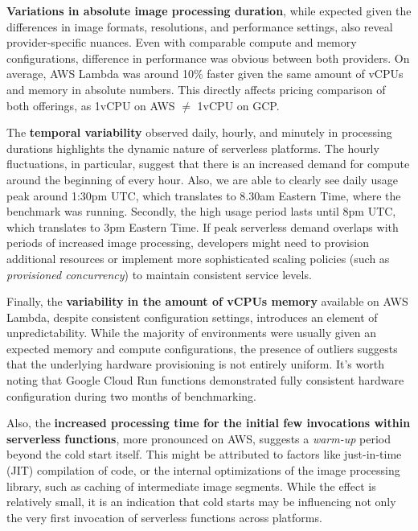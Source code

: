 \textbf{Variations in absolute image processing duration}, while expected given the differences in image formats, resolutions, and performance settings, also reveal provider-specific nuances. Even with comparable compute and memory configurations, difference in performance was obvious between both providers. On average, AWS Lambda was around 10\% faster given the same amount of vCPUs and memory in absolute numbers. This directly affects pricing comparison of both offerings, as 1vCPU on AWS $\neq$ 1vCPU on GCP.

The \textbf{temporal variability} observed daily, hourly, and minutely in processing durations highlights the dynamic nature of serverless platforms. The hourly fluctuations, in particular, suggest that there is an increased demand for compute around the beginning of every hour. Also, we are able to clearly see daily usage peak around 1:30pm UTC, which translates to 8.30am Eastern Time, where the benchmark was running. Secondly, the high usage period lasts until 8pm UTC, which translates to 3pm Eastern Time. If peak serverless demand overlaps with periods of increased image processing, developers might need to provision additional resources or implement more sophisticated scaling policies (such as \emph{provisioned concurrency}) to maintain consistent service levels.

Finally, the \textbf{variability in the amount of vCPUs memory} available on AWS Lambda, despite consistent configuration settings, introduces an element of unpredictability. While the majority of environments were usually given an expected memory and compute configurations, the presence of outliers suggests that the underlying hardware provisioning is not entirely uniform. It's worth noting that Google Cloud Run functions demonstrated fully consistent hardware configuration during two months of benchmarking.

Also, the \textbf{increased processing time for the initial few invocations within serverless functions}, more pronounced on AWS, suggests a \emph{warm-up} period beyond the cold start itself. This might be attributed to factors like just-in-time (JIT) compilation of code, or the internal optimizations of the image processing library, such as caching of intermediate image segments. While the effect is relatively small, it is an indication that cold starts may be influencing not only the very first invocation of serverless functions across platforms.


\newpage

